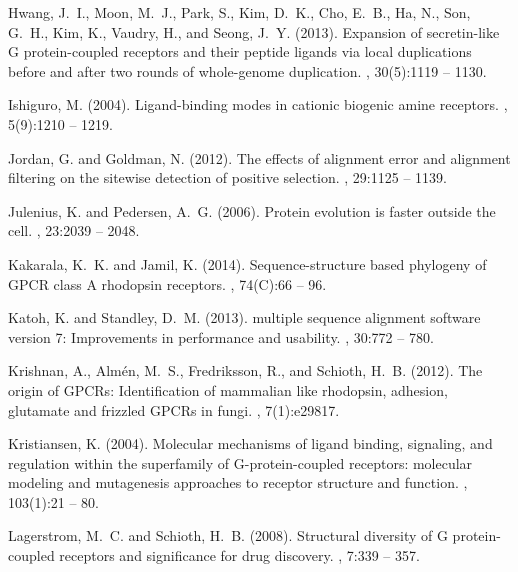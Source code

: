 \documentclass[fleqn,10pt]{wlpeerj}
\begin{document}
\begin{thebibliography}{}
Hwang, J.~I., Moon, M.~J., Park, S., Kim, D.~K., Cho, E.~B., Ha, N., Son,
  G.~H., Kim, K., Vaudry, H., and Seong, J.~Y. (2013).
\newblock Expansion of secretin-like {G} protein-coupled receptors and their
  peptide ligands via local duplications before and after two rounds of
  whole-genome duplication.
, 30(5):1119 -- 1130.

Ishiguro, M. (2004).
\newblock Ligand-binding modes in cationic biogenic amine receptors.
, 5(9):1210 -- 1219.

Jordan, G. and Goldman, N. (2012).
\newblock The effects of alignment error and alignment filtering on the
  sitewise detection of positive selection.
, 29:1125 -- 1139.

Julenius, K. and Pedersen, A.~G. (2006).
\newblock Protein evolution is faster outside the cell.
, 23:2039 -- 2048.

Kakarala, K.~K. and Jamil, K. (2014).
\newblock Sequence-structure based phylogeny of {GPCR} class {A} rhodopsin
  receptors.
, 74(C):66 -- 96.

Katoh, K. and Standley, D.~M. (2013).
 multiple sequence alignment software version 7: Improvements
  in performance and usability.
, 30:772 -- 780.

Krishnan, A., Alm{\'e}n, M.~S., Fredriksson, R., and Schioth, H.~B. (2012).
\newblock The origin of {GPCR}s: Identification of mammalian like rhodopsin,
  adhesion, glutamate and frizzled {GPCR}s in fungi.
, 7(1):e29817.

Kristiansen, K. (2004).
\newblock Molecular mechanisms of ligand binding, signaling, and regulation
  within the superfamily of {G}-protein-coupled receptors: molecular modeling
  and mutagenesis approaches to receptor structure and function.
, 103(1):21 -- 80.

Lagerstrom, M.~C. and Schioth, H.~B. (2008).
\newblock Structural diversity of {G} protein-coupled receptors and
  significance for drug discovery.
, 7:339 -- 357.


\end{thebibliography}
\end{document}
